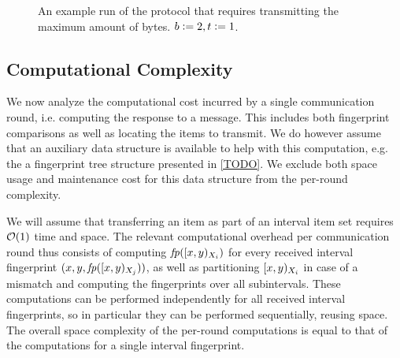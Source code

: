 \begin{figure*}
\begin{scaletikzpicturetowidth}{\textwidth}
\end{scaletikzpicturetowidth}

\caption{An example run of the protocol that requires transmitting the maximum amount of bytes. $b \vcentcolon= 2, t \vcentcolon= 1$.}

\label{fig:worst-bytes}
\end{figure*}

\subsection{Computational Complexity}

We now analyze the computational cost incurred by a single communication round, i.e. computing the response to a message. This includes both fingerprint comparisons as well as locating the items to transmit. We do however assume that an auxiliary data structure is available to help with this computation, e.g. the a fingerprint tree structure presented in \cref{TODO}. We exclude both space usage and maintenance cost for this data structure from the per-round complexity.

We will assume that transferring an item as part of an interval item set requires $\mathcal{O}(1)$ time and space. The relevant computational overhead per communication round thus consists of computing $\mathit{fp}([{x},{y})_{X_i})$ for every received interval fingerprint $({x}, {y}, {\mathit{fp}([{x},{y})_{X_j})})$, as well as partitioning $[{x},{y})_{X_i}$ in case of a mismatch and computing the fingerprints over all subintervals. These computations can be performed independently for all received interval fingerprints, so in particular they can be performed sequentially, reusing space. The overall space complexity of the per-round computations is equal to that of the computations for a single interval fingerprint.

